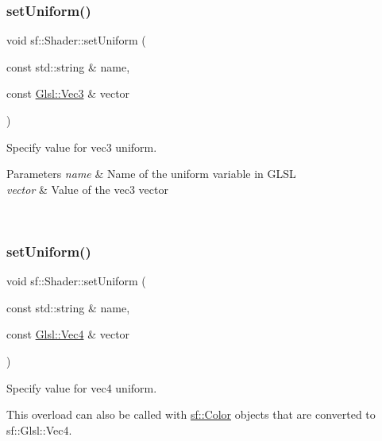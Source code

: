 \subsubsection{\texorpdfstring{setUniform()}{setUniform()}\hspace{0.1cm}{\footnotesize\ttfamily [3/16]}}
{\footnotesize\ttfamily void sf\+::\+Shader\+::set\+Uniform (\begin{DoxyParamCaption}\item[{const std\+::string \&}]{name,  }\item[{const \mbox{\hyperlink{namespacesf_1_1_glsl_a9bdd0463b7cb5316244a082007bd50f0}{Glsl\+::\+Vec3}} \&}]{vector }\end{DoxyParamCaption})}



Specify value for {\ttfamily vec3} uniform. 


\begin{DoxyParams}{Parameters}
{\em name} & Name of the uniform variable in G\+L\+SL \\
\hline
{\em vector} & Value of the vec3 vector \begin{DoxyVerb}\end{DoxyVerb}
 \\
\hline
\end{DoxyParams}
\mbox{\label{classsf_1_1_shader_abc1aee8343800680fd62e1f3d43c24bf}} 
\subsubsection{\texorpdfstring{setUniform()}{setUniform()}\hspace{0.1cm}{\footnotesize\ttfamily [4/16]}}
{\footnotesize\ttfamily void sf\+::\+Shader\+::set\+Uniform (\begin{DoxyParamCaption}\item[{const std\+::string \&}]{name,  }\item[{const \mbox{\hyperlink{structsf_1_1priv_1_1_vector4}{Glsl\+::\+Vec4}} \&}]{vector }\end{DoxyParamCaption})}



Specify value for {\ttfamily vec4} uniform. 

This overload can also be called with \mbox{\hyperlink{classsf_1_1_color}{sf\+::\+Color}} objects that are converted to sf\+::\+Glsl\+::\+Vec4.

